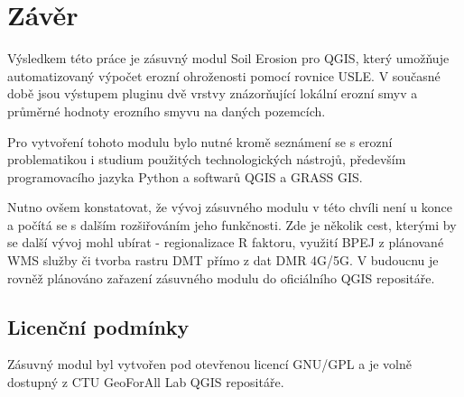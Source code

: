 \chapter{Závěr}
Výsledkem této práce je zásuvný modul Soil Erosion pro QGIS, který umožňuje automatizovaný výpočet erozní ohroženosti pomocí rovnice USLE. V současné době jsou výstupem pluginu dvě vrstvy znázorňující lokální erozní smyv a průměrné hodnoty erozního smyvu na daných pozemcích.

Pro vytvoření tohoto modulu bylo nutné kromě seznámení se s erozní problematikou i studium použitých technologických nástrojů, především programovacího jazyka Python a softwarů QGIS a GRASS GIS.

Nutno ovšem konstatovat, že vývoj zásuvného modulu v této chvíli není u konce a počítá se s dalším rozšiřováním jeho funkčnosti. Zde je několik cest, kterými by se další vývoj mohl ubírat - regionalizace R faktoru, využití BPEJ z plánované WMS služby či tvorba rastru DMT přímo z dat DMR 4G/5G. V budoucnu je rovněž plánováno zařazení zásuvného modulu do oficiálního QGIS repositáře.

\section{Licenční podmínky}
Zásuvný modul byl vytvořen pod otevřenou licencí GNU/GPL a je volně dostupný z CTU GeoForAll Lab QGIS repositáře.